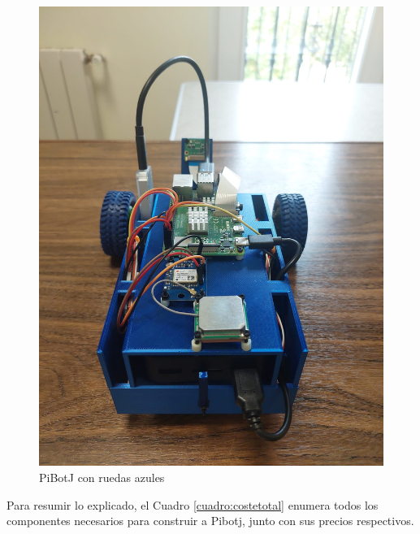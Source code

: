 \begin{figure} [h!]
	\begin{center}
		\includegraphics[width=12cm]{figs/cap5/ra.jpeg}
	\end{center}
	\caption{PiBotJ con ruedas azules} 
	\label{fig:ra}
\end{figure}


Para resumir lo explicado, el Cuadro \ref{cuadro:costetotal} enumera todos los componentes necesarios para construir a Pibotj, junto con sus precios respectivos.

